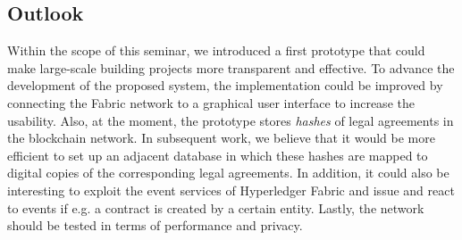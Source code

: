 \subsection{Outlook}
Within the scope of this seminar, we introduced a first prototype that could make large-scale building projects more transparent and effective. To advance the development of the proposed system, the implementation could be improved by connecting the Fabric network to a graphical user interface to increase the usability. 
Also, at the moment, the prototype stores \textit{hashes} of legal agreements in the blockchain network. In subsequent work, we believe that it would be more efficient to set up an adjacent database in which these hashes are mapped to digital copies of the corresponding legal agreements. 
In addition, it could also be interesting to exploit the event services of Hyperledger Fabric and issue and react to events if e.g. a contract is created by a certain entity. Lastly, the network should be tested in terms of performance and privacy.